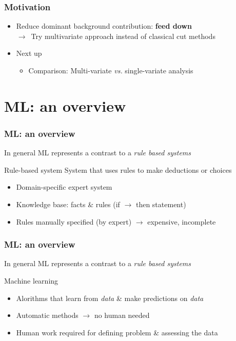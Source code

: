 \documentclass{beamer}
\begin{document}
{
\begin{frame}
    \frametitle{Motivation}
    \begin{itemize}
        \item Reduce dominant background contribution: \textbf{feed down}\\\hspace*{5mm}$\to$~Try multivariate approach instead of classical cut methods\\\vspace*{5mm}
        \item Next up
        \begin{itemize}
            \item Comparison: Multi-variate \emph{vs.} single-variate analysis
        \end{itemize}
     \end{itemize}
\end{frame}
}


\section{ML: an overview} %

\begin{frame}
    \frametitle{ML: an overview}
    In general ML represents a contrast to a \emph{rule based systems}
    \begin{block}{Rule-based system}
        System that uses rules to make deductions or choices
        \begin{itemize}
            \item<1-> Domain-specific expert system
            \item<2-> Knowledge base: facts \& rules (if $\to$ then statement)
            \item<3-> Rules manually specified (by expert) $\to$ expensive, incomplete
        \end{itemize}
    \end{block}
\end{frame}


\begin{frame}
    \frametitle{ML: an overview}
    In general ML represents a contrast to a \emph{rule based systems}
    \begin{block}{Machine learning}
        \begin{itemize}
            \item<1-> Alorithms that learn from \emph{data} \& make predictions on \emph{data}
            \item<2-> Automatic methods $\to$ no human needed
            \item<3-> Human work required for defining problem \& assessing the data
        \end{itemize}
    \end{block}
\end{frame}
\end{document}
